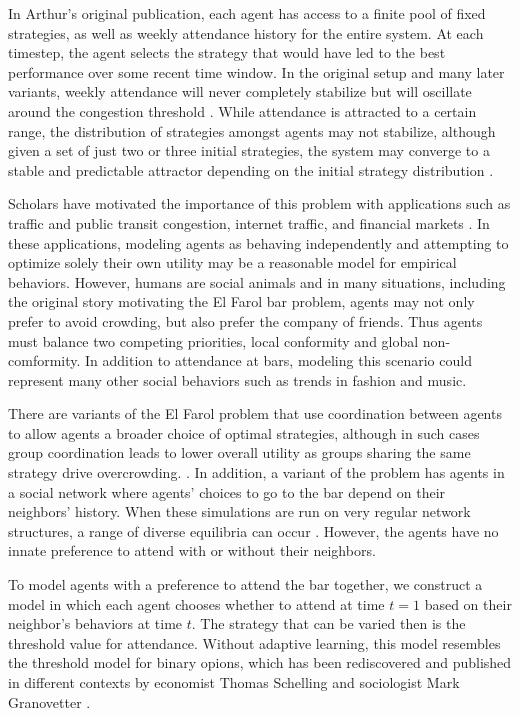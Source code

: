 \documentclass[12pt]{article}
\begin{document}
In Arthur's original publication, each agent has access to a finite pool of fixed strategies, as well as weekly attendance history for the entire system.  At each timestep, the agent selects the strategy that would have led to the best performance over some recent time window.  In the original setup and many later variants, weekly attendance will never completely stabilize but will oscillate around the congestion threshold \cite{arthur:1994} \cite{chen:2012} \cite{zambrano:2004}.  While attendance is attracted to a certain range, the distribution of strategies amongst agents may not stabilize, although given a set of just two or three initial strategies, the system may converge to a stable and predictable attractor depending on the initial strategy distribution \cite{stLuce:2020}.

Scholars have motivated the importance of this problem with applications such as traffic and public transit congestion, internet traffic, and financial markets \cite{zambrano:2004} \cite{chen:2012}.  In these applications, modeling agents as behaving independently and attempting to optimize solely their own utility may be a reasonable model for empirical behaviors.  However, humans are social animals and in many situations, including the original story motivating the El Farol bar problem, agents may not only prefer to avoid crowding, but also prefer the company of friends.  Thus agents must balance two competing priorities, local conformity and global non-comformity.  In addition to attendance at bars, modeling this scenario could represent many other social behaviors such as trends in fashion and music.

There are variants of the El Farol problem that use coordination between agents to allow agents a broader choice of optimal strategies, although in such cases group coordination leads to lower overall utility as groups sharing the same strategy drive overcrowding. \cite{collins:2017} \cite{wilensky:2015}.  In addition, a variant of the problem has agents in a social network where agents' choices to go to the bar depend on their neighbors' history.   When these simulations are run on very regular network structures, a range of diverse equilibria can occur \cite{chen:2012}.  However, the agents have no innate preference to attend with or without their neighbors.

To model agents with a preference to attend the bar together, we construct a model in which each agent chooses whether to attend at time $t = 1$ based on their neighbor's behaviors at time $t$.  The strategy that can be varied then is the threshold value for attendance.  Without adaptive learning, this model resembles the threshold model for binary opions, which has been rediscovered and published in different contexts by economist Thomas Schelling \cite{schelling:1978} and sociologist Mark Granovetter \cite{granovetter:1978} \cite{grabish:2020}.  
\end{document}
